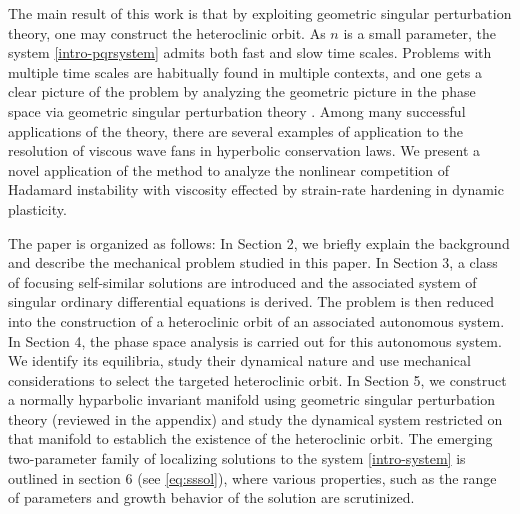 \documentclass[a4paper,11pt]{article}
\numberwithin{step}{dummy}
\begin{document}
The main result of this work is that by exploiting geometric singular perturbation theory, one may  construct the heteroclinic orbit.
As $n$ is a small parameter,  the system \eqref{intro-pqrsystem} admits both fast and slow time scales. Problems with multiple time scales are habitually found 
in multiple contexts, and one  gets a clear picture of the problem by analyzing the geometric picture in the phase space via geometric 
singular perturbation theory \cite{fenichel_persistence_1972, fenichel_geometric_1979, jones_geometric_1995, wiggins_normally_1994, KUEHN_2015}.
 Among many successful applications of the theory, there are several examples 
 \cite{gasser_geometric_1993, freistuhler_spectral_2002, xiao_stability_2003, SS_2004,ghazaryan_traveling_2007} of application to the resolution
 of viscous wave fans in hyperbolic conservation laws. We present a novel application of the method to
 analyze the nonlinear competition of Hadamard instability with viscosity effected by strain-rate hardening in dynamic plasticity.


The paper is organized as follows: In Section 2, we briefly explain the background and describe the mechanical problem studied in this paper. 
In Section 3,  a class of focusing self-similar solutions are introduced  and the associated system of singular ordinary differential equations is derived. 
The problem  is then reduced into the construction of a heteroclinic orbit of an associated autonomous system. 
In Section 4,  the phase space analysis is carried out for this autonomous system. 
We identify its equilibria,  study their dynamical nature and use mechanical considerations to  select the targeted heteroclinic orbit. 
In Section 5,  we  construct a normally hyparbolic invariant manifold using geometric singular perturbation theory (reviewed in the appendix) and study the
dynamical system restricted on  that manifold to establich the existence of the heteroclinic orbit.  
 The emerging two-parameter family of localizing solutions
to the system \eqref{intro-system} is outlined in section 6 (see \eqref{eq:sssol}), where various properties, such as the  range of parameters 
and growth behavior of the solution are scrutinized.
\end{document}
